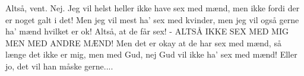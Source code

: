 \documentclass[a4paper,12pt]{article}
\begin{document}
\begin{sketch}
  Altså, vent. Nej. Jeg vil helst heller ikke have sex med mænd, men ikke fordi der er noget galt i det! Men jeg vil mest ha' sex med kvinder, men jeg vil også gerne ha' mænd hvilket er ok! Altså, at de får sex! - ALTSÅ IKKE SEX MED MIG MEN MED ANDRE MÆND! Men det er okay at de har sex med mænd, så længe det ikke er mig, men med Gud, nej Gud vil ikke ha' sex med mænd! Eller jo, det vil han måske gerne.... 


\act{[Lys ned.}


\end{sketch}
\end{document}
